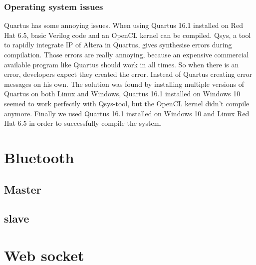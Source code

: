 \documentclass[12pt,a4paper,english,twoside,openright]{tutthesis}
\begin{document}
			\subsubsection{Operating system issues}
Quartus has some annoying issues. When using Quartus 16.1 installed on Red Hat 6.5, basic Verilog code and an OpenCL kernel can be compiled. Qsys, a tool to rapidly integrate IP of Altera in Quartus, gives synthesise errors during compilation. Those errors are really annoying, because an expensive commercial available program like Quartus should work in all times. So when there is an error, developers expect they created the error. Instead of Quartus creating error messages on his own. The solution was found by installing multiple versions of Quartus on both Linux and Windows, Quartus 16.1 installed on Windows 10 seemed to work perfectly with Qsys-tool, but the OpenCL kernel didn't compile anymore. Finally we used Quartus 16.1 installed on Windows 10 and Linux Red Hat 6.5 in order to successfully compile the system.
		\section{Bluetooth}
			\subsection{Master}
			\subsection{slave}
		\section{Web socket}



\end{document}
